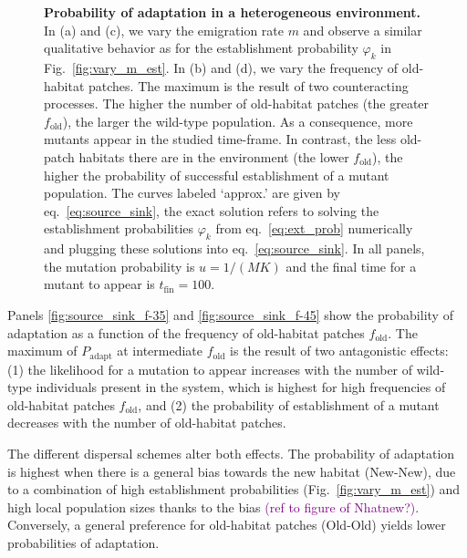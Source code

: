 \documentclass[11pt]{article}
\newcommand{\florence}[1]{\textcolor{purple}{(#1)}} %
\begin{document}
\begin{figure}[t!]
	\caption{\textbf{Probability of adaptation in a heterogeneous environment.} \small In (a) and (c), we vary the emigration rate $m$ and observe a similar qualitative behavior as for the establishment probability $\varphi_k$ in Fig.~\ref{fig:vary_m_est}. In (b) and (d), we vary the frequency of old-habitat patches. The maximum is the result of two counteracting processes. The higher the number of old-habitat patches (the greater $f_{\text{old}}$), the larger the wild-type population. As a consequence, more mutants appear in the studied time-frame. In contrast, the less old-patch habitats there are in the environment (the lower $f_{\text{old}}$), the higher the probability of successful establishment of a mutant population. The curves labeled `approx.' are given by eq.~\eqref{eq:source_sink}, the exact solution refers to solving the establishment probabilities $\varphi_k$ from eq.~\eqref{eq:ext_prob} numerically and plugging these solutions into eq.~\eqref{eq:source_sink}. In all panels, the mutation probability is $u=1/(M K)$ and the final time for a mutant to appear is $t_{\text{fin}}=100$. }
	\label{fig:source_sink}
\end{figure}

Panels \ref{fig:source_sink_f-35} and \ref{fig:source_sink_f-45} show the probability of adaptation as a function of the frequency of old-habitat patches $f_{\text{old}}$. The maximum of $P_{\mathrm{adapt}}$ at intermediate  $f_{\text{old}}$ is the result of two antagonistic effects: (1) the likelihood for a mutation to appear increases with the number of wild-type individuals present in the system, which is highest for high frequencies of old-habitat patches $f_{\text{old}}$, and (2) the probability of establishment of a mutant decreases with the number of old-habitat patches. 

The different dispersal schemes alter both effects. The probability of adaptation is highest when there is a general bias towards the new habitat (New-New), due to a combination of high establishment probabilities (Fig.~\ref{fig:vary_m_est}) and high local population sizes thanks to the bias \florence{ref to figure of Nhatnew?}. Conversely, a general preference for old-habitat patches (Old-Old) yields lower probabilities of adaptation.  

\clearpage
\end{document}
